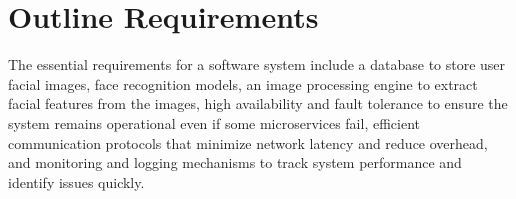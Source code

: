 \section{Outline Requirements}

\quad The essential requirements for a software system include a database to store user facial images, face recognition models, an image processing engine to extract facial features from the images, high availability and fault tolerance to ensure the system remains operational even if some microservices fail, efficient communication protocols that minimize network latency and reduce overhead, and monitoring and logging mechanisms to track system performance and identify issues quickly.
